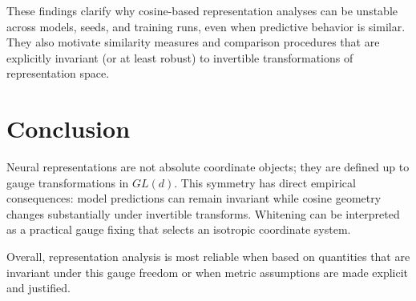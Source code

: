 \documentclass[11pt]{article}
\begin{document}
These findings clarify why cosine-based representation analyses can be
unstable across models, seeds, and training runs, even when predictive
behavior is similar.
They also motivate similarity measures and comparison procedures that are
explicitly invariant (or at least robust) to invertible transformations of
representation space.

\section{Conclusion}

Neural representations are not absolute coordinate objects; they are
defined up to gauge transformations in $GL(d)$.
This symmetry has direct empirical consequences:
model predictions can remain invariant while cosine geometry changes
substantially under invertible transforms.
Whitening can be interpreted as a practical gauge fixing that selects an
isotropic coordinate system.

Overall, representation analysis is most reliable when based on quantities
that are invariant under this gauge freedom or when metric assumptions are
made explicit and justified.



\end{document}

